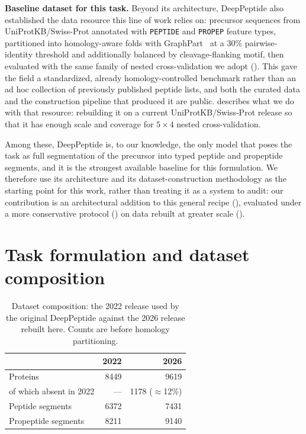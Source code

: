 \documentclass{article}
\begin{document}
\textbf{Baseline dataset for this task.} Beyond its architecture, DeepPeptide also established the data resource this line of work relies on: precursor sequences from UniProtKB/Swiss-Prot annotated with \texttt{PEPTIDE} and \texttt{PROPEP} feature types, partitioned into homology-aware folds with GraphPart~\citep{graphpart2023} at a 30\% pairwise-identity threshold and additionally balanced by cleavage-flanking motif, then evaluated with the same family of nested cross-validation we adopt (). This gave the field a standardized, already homology-controlled benchmark rather than an ad hoc collection of previously published peptide lists, and both the curated data and the construction pipeline that produced it are public.  describes what we do with that resource: rebuilding it on a current UniProtKB/Swiss-Prot release so that it has enough scale and coverage for $5\times4$ nested cross-validation.

Among these, DeepPeptide is, to our knowledge, the only model that poses the task as full segmentation of the precursor into typed peptide and propeptide segments, and it is the strongest available baseline for this formulation. We therefore use its architecture and its dataset-construction methodology as the starting point for this work, rather than treating it as a system to audit: our contribution is an architectural addition to this general recipe (), evaluated under a more conservative protocol () on data rebuilt at greater scale ().


\section{Task formulation and dataset composition}
\label{sec:app-problem}

\begin{table}[h]
\centering
\caption{Dataset composition: the 2022 release used by the original DeepPeptide against the 2026 release rebuilt here. Counts are before homology partitioning.}
\label{tab:dataset}
\small
\begin{tabular}{lrr}
\toprule
 & \textbf{2022} & \textbf{2026} \\
\midrule
Proteins & 8449 & 9619 \\
\quad of which absent in 2022 & --- & 1178 ($\approx$12\%) \\
Peptide segments & 6372 & 7431 \\
Propeptide segments & 8211 & 9140 \\
\bottomrule
\end{tabular}
\end{table}
\end{document}
